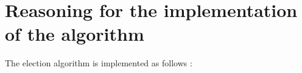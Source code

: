 \documentclass{article}
\begin{document}
\newpage


\section{Reasoning for the implementation of the algorithm}
The election algorithm is implemented as follows : 
\end{document}
